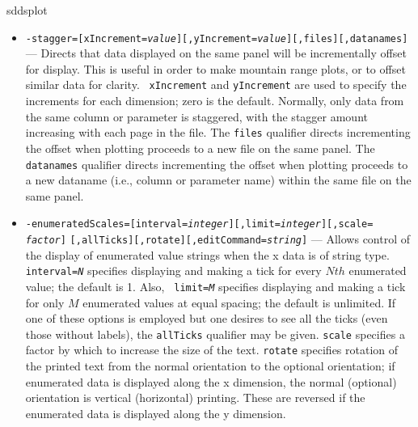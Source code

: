 \begin{sddsprog}{sddsplot}
\begin{itemize}
\begin{itemize}
{\tt logarithmic} mode implies that the base-ten logarithmic of the
appropriate values is taken prior to plotting.  Normally, this does
not produce log-type scales; use of the {\tt specialScales} keyword
together with the {\tt logarithmic} keyword will obtain this. One can
also use the {\tt -tickSettings} option for this, which is the preferred
method.  {\tt autolog} mode results in choice of linear or log-scale plotting
based on the range of the data.  If the range of the data is more than a factor
of 15, then log mode is used (with log scales).  Otherwise, linear mode is used.

{\tt fractionalDeviation} plots the data after subtracting and then dividing by the mean value.

\item {\tt -stagger=[xIncrement={\em value}][,yIncrement={\em value}][,files][,datanames]} ---
Directs that data displayed on the same panel will be incrementally offset for display.  This is
useful in order to make mountain range plots, or to offset similar data for clarity.  {\tt
xIncrement} and {\tt yIncrement} are used to specify the increments for each dimension; zero is the
default.  Normally, only data from the same column or parameter is staggered, with the stagger amount
increasing with each page in the file.  The {\tt files} qualifier directs incrementing the offset
when plotting proceeds to a new file on the same panel.  The {\tt datanames} qualifier directs
incrementing the offset when plotting proceeds to a new dataname (i.e., column or parameter name)
within the same file on the same panel.

  \item {\tt -enumeratedScales=[interval={\em integer}][,limit={\em integer}][,scale={\em
factor}]} {\tt [,allTicks][,rotate][,editCommand={\em string}]} --- Allows control of the display of
enumerated value strings when the x data is of string type.  {\tt interval={\em N}} specifies
displaying and making a tick for every $N {th}$ enumerated value; the default is 1.  Also, {\tt
limit={\em M}} specifies displaying and making a tick for only $M$ enumerated values at equal
spacing; the default is unlimited.  If one of these options is employed but one desires to see all
the ticks (even those without labels), the {\tt allTicks} qualifier may be given.  {\tt scale}
specifies a factor by which to increase the size of the text.  {\tt rotate} specifies rotation of the
printed text from the normal orientation to the optional orientation; if enumerated data is displayed
along the x dimension, the normal (optional) orientation is vertical (horizontal) printing.  These
are reversed if the enumerated data is displayed along the y dimension.


\end{itemize}
\end{itemize}
\end{sddsprog}
